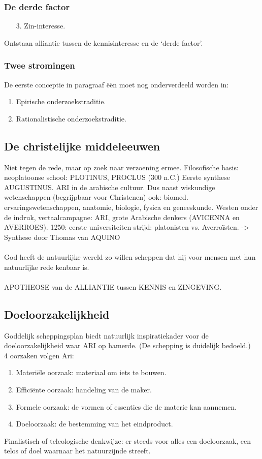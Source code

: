 \subsubsection{De derde factor}
\begin{enumerate}
\item[3.]Zin-interesse.
\end{enumerate}
Ontstaan alliantie tussen de kennisinteresse en de ‘derde factor’.
\subsubsection{Twee stromingen}
De eerste conceptie in paragraaf \"e\"en moet nog onderverdeeld worden in:
\begin{enumerate}
\item Epirische onderzoekstraditie.
\item Rationalistische onderzoekstraditie.
\end{enumerate}
\subsection{De christelijke middeleeuwen}
Niet tegen de rede, maar op zoek naar verzoening ermee.
Filosofische basis: neoplatoonse school: PLOTINUS, PROCLUS (300 n.C.) Eerste synthese AUGUSTINUS.
ARI in de arabische cultuur. Dus naast wiskundige wetenschappen (begrijpbaar voor Christenen) ook: biomed. ervaringswetenschappen, anatomie, biologie, fysica en geneeskunde.
Westen onder de indruk, vertaalcampagne: ARI, grote Arabische denkers (AVICENNA en AVERROES).
1250: eerste universiteiten strijd: platonisten vs. Averroïsten.
-> Synthese door Thomas van AQUINO
\\
\\
God heeft de natuurlijke wereld zo willen scheppen dat hij voor mensen met hun natuurlijke rede kenbaar is.
\\
\\
APOTHEOSE van de ALLIANTIE tussen KENNIS en ZINGEVING.
\subsection{Doeloorzakelijkheid}
Goddelijk scheppingsplan biedt natuurlijk inspiratiekader voor de doeloorzakelijkheid waar ARI op hamerde. (De schepping is duidelijk bedoeld.)
\\
4 oorzaken volgen Ari:
\begin{enumerate}
\item Materi\"ele oorzaak: materiaal om iets te bouwen.
\item Effici\"ente oorzaak: handeling van de maker.
\item Formele oorzaak: de vormen of essenties die de materie kan aannemen.
\item Doeloorzaak: de bestemming van het eindproduct.
\end{enumerate}
Finalistisch of teleologische denkwijze: er steeds voor alles een doeloorzaak, een telos of doel waarnaar het natuurzijnde streeft.
